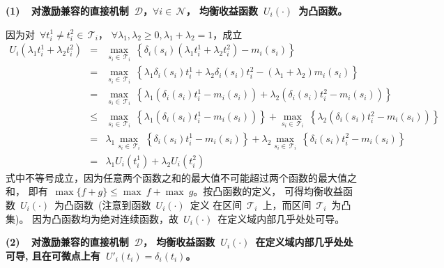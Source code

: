 \documentclass[a4paper,12pt]{article}
\begin{document}
\textbf{(1)~~对激励兼容的直接机制~$\mathcal{D}$，$\forall i\in\,\mathcal{N}$，
均衡收益函数~$U_i(\cdot)$~为凸函数。}\vspace{5pt}

因为对~$\forall t_i^1\neq t_i^2\in\,\mathcal{T}_i$，
$\forall \lambda_1,\lambda_2\ge 0, \lambda_1+\lambda_2=1$，成立
\begin{eqnarray*}
  U_i\left(\lambda_1t_i^1 + \lambda_2t_i^2\right) &=& \max_{s_i\in\,\mathcal{T}_i}
     ~\left\{\delta_i(s_i)\left(\lambda_1t_i^1 + \lambda_2t_i^2\right) - m_i(s_i)\right\}\\
   &=& \max_{s_i\in\,\mathcal{T}_i}
     ~\left\{\lambda_1\delta_i(s_i)t_i^1 + \lambda_2\delta_i(s_i)t_i^2
     - (\lambda_1 + \lambda_2)m_i(s_i)\right\} \\
   &=& \max_{s_i\in\,\mathcal{T}_i}
     ~\left\{\lambda_1\left(\delta_i(s_i)t_i^1 - m_i(s_i)\right)
     + \lambda_2\left(\delta_i(s_i)t_i^2 - m_i(s_i)\right)\right\} \\
   &\leq& \max_{s_i\in\,\mathcal{T}_i}
     ~\left\{\lambda_1\left(\delta_i(s_i)t_i^1 - m_i(s_i)\right)\right\}
     + \max_{s_i\in\,\mathcal{T}_i}
     ~\left\{\lambda_2\left(\delta_i(s_i)t_i^2 - m_i(s_i)\right)\right\} \\
   &=& \lambda_1\max_{s_i\in\,\mathcal{T}_i}
     ~\left\{\delta_i(s_i)t_i^1 - m_i(s_i)\right\}
     + \lambda_2\max_{s_i\in\,\mathcal{T}_i}
     ~\left\{\delta_i(s_i)t_i^2 - m_i(s_i)\right\}\\
   &=& \lambda_1U_i\left(t_i^1\right) + \lambda_2U_i\left(t_i^2\right)
\end{eqnarray*}
式中不等号成立，因为任意两个函数之和的最大值不可能超过两个函数的最大值之和，
即有~$\max\{f+g\}\le\max~f+\max~g$。按凸函数的定义，
可得均衡收益函数~$U_i(\cdot)$~为凸函数~(注意到函数~$U_i(\cdot)$~定义
在区间~$\mathcal{T}_i$~上，而区间~$\mathcal{T}_i$~为凸集)。
因为凸函数均为绝对连续函数，故~$U_i(\cdot)$~在定义域内部几乎处处可导。

\textbf{(2)~~对激励兼容的直接机制~$\mathcal{D}$，
均衡收益函数~$U_i(\cdot)$~在定义域内部几乎处处可导,
且在可微点上有~$U'_i(t_i) = \delta_i(t_i)$。}\vspace{5pt}
\end{document}
